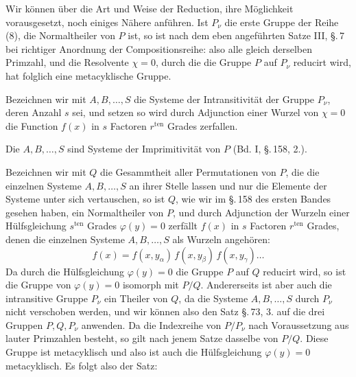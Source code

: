 
Wir können über die Art und Weise der Reduction, ihre Möglichkeit vorausgesetzt,
noch einiges Nähere anführen. Ist $P_\nu$ die erste Gruppe der Reihe (8), die
Normaltheiler von $P$ ist, so ist nach dem eben angeführten Satze III, §.\,7 bei
richtiger Anordnung der Compositionsreihe:
also alle gleich derselben Primzahl, und die Resolvente $\chi = 0$, durch die die
Gruppe $P$ auf $P_\nu$ reducirt wird, hat folglich eine metacyklische Gruppe.

Bezeichnen wir mit $A, B, \ldots, S$ die Systeme der Intransitivität der Gruppe
$P_\nu$, deren Anzahl $s$ sei, und setzen
so wird durch Adjunction einer Wurzel von $\chi = 0$ die Function $f(x)$ in $s$
Factoren $r^{\mathrm{ten}}$ Grades zerfallen.

Die $A, B, \ldots, S$ sind Systeme der Imprimitivität von $P$ (Bd. I, §.\,158, 2.).

Bezeichnen wir mit $Q$ die Gesammtheit aller Permutationen von $P$, die die
einzelnen Systeme $A, B, \ldots, S$ an ihrer Stelle lassen und nur die Elemente
der Systeme unter sich vertauschen, so ist $Q$, wie wir im §.\,158 des ersten
Bandes gesehen haben, ein Normaltheiler von $P$, und durch Adjunction der Wurzeln
einer Hülfsgleichung $s^{\mathrm{ten}}$ Grades $\varphi(y) = 0$ zerfällt $f(x)$ in
$s$ Factoren $r^{\mathrm{ten}}$ Grades, denen die einzelnen Systeme
$A, B, \ldots, S$ als Wurzeln angehören:
\[
f(x) = f(x, y_\alpha)\, f(x, y_\beta)\, f(x, y_\gamma) \ldots
\]
Da durch die Hülfsgleichung $\varphi(y) = 0$ die Gruppe $P$ auf $Q$ reducirt wird,
so ist die Gruppe von $\varphi(y) = 0$ isomorph mit $P/Q$. Andererseits ist aber
auch die intransitive Gruppe $P_\nu$ ein Theiler von $Q$, da die Systeme
$A, B, \ldots, S$ durch $P_\nu$ nicht verschoben werden, und wir können also den
Satz §.\,73, 3. auf die drei Gruppen $P, Q, P_\nu$ anwenden. Da die Indexreihe
von $P/P_\nu$ nach Voraussetzung aus lauter Primzahlen besteht, so gilt nach
jenem Satze dasselbe von $P/Q$. Diese Gruppe ist metacyklisch und also ist auch
die Hülfsgleichung $\varphi(y) = 0$ metacyklisch. Es folgt also der Satz:
